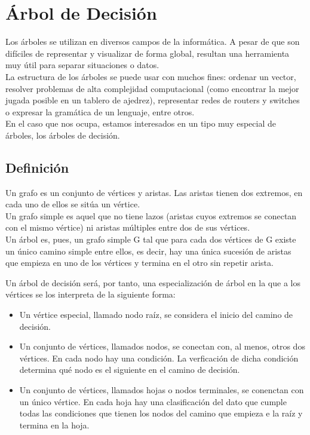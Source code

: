 \section{\'Arbol de Decisi\'on}\label{sec:Decision_tree}
	
		Los \'arboles se utilizan en diversos campos de la inform\'atica. A pesar de que son dif\'iciles de representar y visualizar de forma global, resultan una herramienta muy \'util para separar situaciones o datos.\\
		
		La estructura de los \'arboles se puede usar con muchos fines: ordenar un vector, resolver problemas de alta complejidad computacional (como encontrar la mejor jugada posible en un tablero de ajedrez), representar redes de routers y switches o expresar la gram\'atica de un lenguaje, entre otros.\\
		
		En el caso que nos ocupa, estamos interesados en un tipo muy especial de \'arboles, los \'arboles de decisi\'on.
		
		\subsection{Definici\'on}
			Un grafo es un conjunto de v\'ertices y aristas. Las aristas tienen dos extremos, en cada uno de ellos se sit\'ua un v\'ertice.\\
			
			Un grafo simple es aquel que no tiene lazos (aristas cuyos extremos se conectan con el mismo v\'ertice) ni aristas m\'ultiples entre dos de sus v\'ertices.\\
			
			Un \'arbol es, pues, un grafo simple G tal que
			para cada dos v\'ertices de G existe un \'unico camino simple entre ellos, es decir, hay una \'unica sucesi\'on de aristas que empieza en uno de los v\'ertices y termina en el otro sin repetir arista.
			
			Un \'arbol de decisi\'on ser\'a, por tanto, una especializaci\'on de \'arbol en la que a los v\'ertices se los interpreta de la siguiente forma:
			\begin{itemize}
				\item Un v\'ertice especial, llamado nodo ra\'iz, se considera el inicio del camino de decisi\'on.
				\item Un conjunto de v\'ertices, llamados nodos, se conectan con, al menos, otros dos v\'ertices. En cada nodo hay una condici\'on. La verficaci\'on de dicha condici\'on determina qu\'e nodo es el siguiente en el camino de decisi\'on.
				\item Un conjunto de v\'ertices, llamados hojas o nodos terminales, se conenctan con un \'unico v\'ertice. En cada hoja hay una clasificaci\'on del dato que cumple todas las condiciones que tienen los nodos del camino que empieza e la ra\'iz y termina en la hoja. 
			\end{itemize}
			
